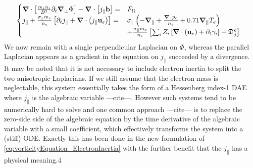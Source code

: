\begin{equation}
	\label{eq:vorticityEquation_ElectronInertia}
	\begin{cases}
		\grad\cdot\left[\frac{m_i n_i}{ B^2}\partial_t\grad_\perp\Phi\right] - \grad\cdot\left[j_\parallel\mathbf{b}\right]=& F_\Omega \\
		j_\parallel + \frac{\sigma_\parallel m_e}{n_e}\left[\partial_t j_\parallel + \grad\cdot\left(j_\parallel\mathbf{u}_e\right)\right] =& \sigma_\parallel \left(-\grad_\parallel + \frac{\grad_\parallel p_e}{n_e} + 0.71\grad_\parallel T_e \right) \\ 
		& + \frac{\sigma_\parallel m_e}{n_e}\left[\sum_iZ_i\left[\grad\cdot\left(\mathbf{u}_e \right) + \partial_t \gamma_i\right] - \mathfrak{D}_j^e\right]
	\end{cases}
\end{equation}
We now remain with a single perpendicular Laplacian on $\Phi$, whereas the parallel Laplacian appears as a gradient in the equation on $j_\parallel$ succeeded by a divergence. It may be noted that it is not necessary to include electron inertia to split the two anisotropic Laplacians. If we still assume that the electron mass is neglectable, this system essentially takes the form of a Hessenberg index-1 DAE where $j_\parallel$ is the algebraic variable ---cite---. However such systems tend to be numerically hard to solve and one common approach ---cite--- is to replace the zero-side side of the algebraic equation by the time derivative of the algebraic variable with a small coefficient, which effectively transforms the system into a (stiff) ODE. Exactly this has been done in the new formulation of \autoref{eq:vorticityEquation_ElectronInertia} with the further benefit that the $j_\parallel$ has a physical meaning.4


